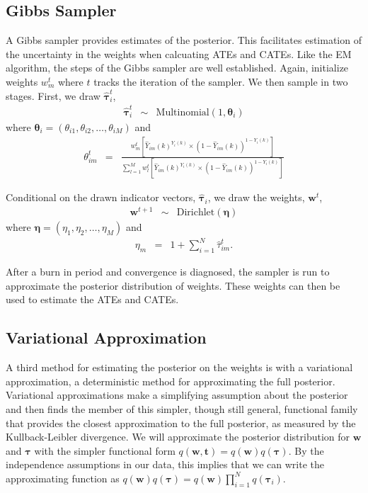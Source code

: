 \documentclass[12pt,letterpaper]{article}
\numberwithin{equation}{section}
\numberwithin{equation}{section}
\begin{document}
\subsection{Gibbs Sampler}
A Gibbs sampler provides estimates of the posterior. This facilitates estimation of the uncertainty in the weights when calcuating ATEs and CATEs.  Like the EM algorithm, the steps of the Gibbs sampler are well established.  Again, initialize weights $w_{m}^{t}$ where $t$ tracks the iteration of the sampler.  We then sample in two stages.  First, we draw $\widehat{\boldsymbol{\tau}}_{i}^{t}$, 
\begin{eqnarray}
\widehat{\boldsymbol{\tau}}_{i}^{t} & \sim & \text{Multinomial}(1, \boldsymbol{\theta}_{i}) \nonumber 
\end{eqnarray}
where $\boldsymbol{\theta}_{i}  = (\theta_{i1}, \theta_{i2}, \hdots, \theta_{iM} )$ and
\begin{eqnarray}
\theta_{im}^{t}  & = & \frac{w_{m}^{t} \left[\widehat{Y}_{im}(k)^{Y_{i} (k)} \times (1 - \widehat{Y}_{im}(k))^{1- Y_{i}(k) }\right] } {\sum_{l = 1}^{M} w_{l}^{t} \left[\widehat{Y}_{im}(k)^{Y_{i} (k)} \times (1 - \widehat{Y}_{im}(k))^{1- Y_{i}(k) }\right]  } \nonumber 
\end{eqnarray}

Conditional on the drawn indicator vectors, $\widehat{\boldsymbol{\tau}}_{i}$, we draw the weights, $\boldsymbol{w}^{t}$, 
\begin{eqnarray}
\boldsymbol{w}^{t + 1} & \sim & \text{Dirichlet}(\boldsymbol{\eta}) \nonumber 
\end{eqnarray}
where $\boldsymbol{\eta}  = (\eta_{1}, \eta_{2}, \hdots, \eta_{M})$ and 
\begin{eqnarray}
\eta_{m} & = & 1 + \sum_{i=1}^{N} \widehat{\tau}_{im}^{t}. \nonumber
\end{eqnarray}

After a burn in period and convergence is diagnosed, the sampler is run to approximate the posterior distribution of weights. These weights can then be used to estimate the ATEs and CATEs.  


\subsection{Variational Approximation}
A third method for estimating the posterior on the weights is with a variational approximation, a deterministic method for approximating the full posterior.  Variational approximations make a simplifying assumption about the posterior and then finds the member of this simpler, though still general, functional family that provides the closest approximation to the full posterior, as measured by the Kullback-Leibler divergence.  We will approximate the posterior distribution for $\boldsymbol{w}$ and $\boldsymbol{\tau}$ with the simpler functional form $q(\boldsymbol{w}, \boldsymbol{t} ) = q(\boldsymbol{w}) q(\boldsymbol{\tau})$.  By the independence assumptions in our data, this implies that we can write the approximating function as $q(\boldsymbol{w})q(\boldsymbol{\tau}) = q(\boldsymbol{w})\prod_{i=1}^{N} q(\boldsymbol{\tau}_{i}) $. 
\end{document}
